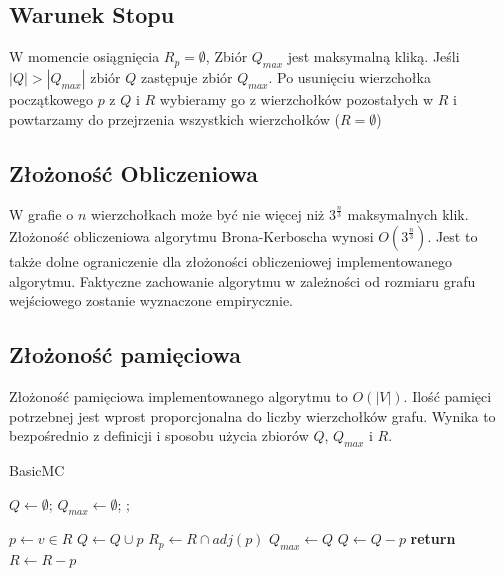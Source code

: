\documentclass[12pt, a4paper]{article}
\begin{document}
\subsection{Warunek Stopu}

W momencie osiągnięcia $R_{p} = \emptyset$, Zbiór $Q_{max}$ jest maksymalną kliką. Jeśli $|Q| > |Q_{max}|$ zbiór $Q$ zastępuje zbiór $Q_{max}$. Po usunięciu wierzchołka początkowego $p$ z $Q$ i $R$ wybieramy go z wierzchołków pozostałych w $R$ i powtarzamy do przejrzenia wszystkich wierzchołków ($R = \emptyset$)

\subsection{Złożoność Obliczeniowa}
W grafie o $n$ wierzchołkach może być nie więcej niż $3^{\frac{n}{3}}$ maksymalnych klik. Złożoność obliczeniowa algorytmu Brona-Kerboscha wynosi $O(3^{\frac{n}{3}})$.
Jest to także dolne ograniczenie dla złożoności obliczeniowej implementowanego algorytmu. Faktyczne zachowanie algorytmu w zależności od rozmiaru grafu wejściowego zostanie wyznaczone empirycznie.

\subsection{Złożoność pamięciowa}
\label{memory_complexity}

Złożoność pamięciowa implementowanego algorytmu to $O(|V|)$. Ilość pamięci potrzebnej jest wprost proporcjonalna do liczby wierzchołków grafu. Wynika to bezpośrednio z definicji i sposobu użycia zbiorów $Q$, $Q_{max}$ i $R$.

\begin{algorithm}
\caption{BasicMC}\label{basicmc}
\begin{algorithmic}[1]
  
\State $Q\gets \emptyset$;
\State $Q_{max}\gets \emptyset$;
\State {};
\EndProcedure
\Statex

  \State $p\gets v\in R$
    \State $Q \gets Q \cup {p}$\label{addPToQ}
    \State $R_p \gets R \cap adj(p)$
      \State {}
      \State $Q_{max} \gets Q$
    \EndIf
    \State $Q \gets Q - {p}$
  \Else
    \textbf{ return}\label{skip}
  \EndIf
  \State $R \gets R - p$
\EndWhile
\EndProcedure

\end{algorithmic}
\end{algorithm}
\end{document}
